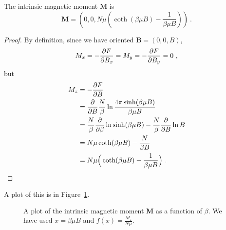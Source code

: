     The intrinsic magnetic moment $\mathbf M$ is 
    \begin{equation*}
        \mathbf M = (0, 0, N\mu (\coth(\beta \mu B) - \frac{1}{\beta \mu B})) ~.
    \end{equation*}
    \begin{proof}
        By definition, since we have oriented $\mathbf B = (0, 0, B)$,
        \begin{equation*}
            M_x = - \frac{\partial F}{\partial B_x} = M_y = - \frac{\partial F}{\partial B_y} = 0 ~,
        \end{equation*}
        but 
        \begin{equation*}
        \begin{aligned}
            M_z & = - \frac{\partial F}{\partial B} \\ & = \frac{\partial}{\partial B} \frac{N}{\beta} \ln \frac{4 \pi \sinh (\beta \mu B)}{\beta \mu B} \\ & = \frac{N}{\beta} \frac{\partial}{\partial\beta} \ln \sinh (\beta \mu B) - \frac{N}{\beta} \frac{\partial}{\partial B} \ln B \\ & = N \mu \coth(\beta \mu B) - \frac{N}{\beta B} \\ & = N \mu \Big (\coth (\beta \mu B) - \frac{1}{\beta \mu B} \Big ) ~.
        \end{aligned}
        \end{equation*}
    \end{proof}
    A plot of this is in Figure~\ref{can:mag}.
    \begin{figure}
        \centering
        \caption{A plot of the intrinsic magnetic moment $\mathbf M$ as a function of $\beta$. We have used $x = \beta \mu B$ and $f(x) = \frac{M_z}{N \mu}$.}
        \label{can:mag}
    \end{figure}

